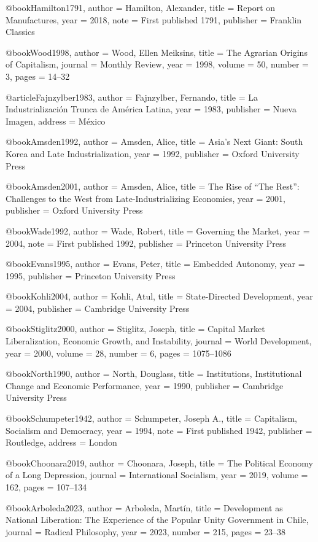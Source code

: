 @book{Hamilton1791,
	author    = {Hamilton, Alexander},
	title     = {Report on Manufactures},
	year      = {2018},
	note      = {First published 1791},
	publisher = {Franklin Classics}
}

@book{Wood1998,
	author  = {Wood, Ellen Meiksins},
	title   = {The Agrarian Origins of Capitalism},
	journal = {Monthly Review},
	year    = {1998},
	volume  = {50},
	number  = {3},
	pages   = {14--32}
}

@article{Fajnzylber1983,
	author    = {Fajnzylber, Fernando},
	title     = {La Industrializaci{\'o}n Trunca de {Am{\'e}rica Latina}},
	year      = {1983},
	publisher = {Nueva Imagen},
	address   = {M{\'e}xico}
}

@book{Amsden1992,
	author    = {Amsden, Alice},
	title     = {Asia's Next Giant: {South Korea} and Late Industrialization},
	year      = {1992},
	publisher = {Oxford University Press}
}

@book{Amsden2001,
	author    = {Amsden, Alice},
	title     = {The Rise of ``The Rest'': Challenges to the {West} from Late-Industrializing Economies},
	year      = {2001},
	publisher = {Oxford University Press}
}

@book{Wade1992,
	author    = {Wade, Robert},
	title     = {Governing the Market},
	year      = {2004},
	note      = {First published 1992},
	publisher = {Princeton University Press}
}

@book{Evans1995,
	author    = {Evans, Peter},
	title     = {Embedded Autonomy},
	year      = {1995},
	publisher = {Princeton University Press}
}

@book{Kohli2004,
	author    = {Kohli, Atul},
	title     = {State-Directed Development},
	year      = {2004},
	publisher = {Cambridge University Press}
}

@book{Stiglitz2000,
	author  = {Stiglitz, Joseph},
	title   = {Capital Market Liberalization, Economic Growth, and Instability},
	journal = {World Development},
	year    = {2000},
	volume  = {28},
	number  = {6},
	pages   = {1075--1086}
}

@book{North1990,
	author    = {North, Douglass},
	title     = {Institutions, Institutional Change and Economic Performance},
	year      = {1990},
	publisher = {Cambridge University Press}
}

@book{Schumpeter1942,
	author    = {Schumpeter, Joseph A.},
	title     = {Capitalism, Socialism and Democracy},
	year      = {1994},
	note      = {First published 1942},
	publisher = {Routledge},
	address   = {London}
}

@book{Choonara2019,
	author  = {Choonara, Joseph},
	title   = {The Political Economy of a Long Depression},
	journal = {International Socialism},
	year    = {2019},
	volume  = {162},
	pages   = {107--134}
}

@book{Arboleda2023,
	author  = {Arboleda, Mart{\'i}n},
	title   = {Development as National Liberation: The Experience of the {Popular Unity} Government in {Chile}},
	journal = {Radical Philosophy},
	year    = {2023},
	number  = {215},
	pages   = {23--38}
}